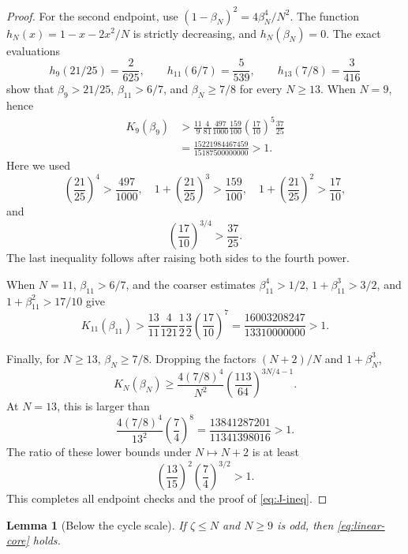 \documentclass[11pt]{article}
\newtheorem{lemma}[theorem]{Lemma}
\begin{document}
\begin{proof}
For the second endpoint, use
\((1-\beta_N)^2=4\beta_N^4/N^2\).  The function
\(h_N(x)=1-x-2x^2/N\) is strictly decreasing, and \(h_N(\beta_N)=0\).
The exact evaluations
\[
 h_9(21/25)=\frac2{625},\qquad
 h_{11}(6/7)=\frac5{539},\qquad
 h_{13}(7/8)=\frac3{416}
\]
show that \(\beta_9>21/25\), \(\beta_{11}>6/7\), and
\(\beta_N\ge7/8\) for every \(N\ge13\).  When \(N=9\), hence
\[
\begin{aligned}
 K_9(\beta_9)
 &>\frac{11}{9}\frac4{81}
    \frac{497}{1000}\frac{159}{100}
    \left(\frac{17}{10}\right)^5\frac{37}{25}\\
 &=\frac{15221984467459}{15187500000000}>1.
\end{aligned}
\]
Here we used
\[
 \left(\frac{21}{25}\right)^4>\frac{497}{1000},
 \quad
 1+\left(\frac{21}{25}\right)^3>\frac{159}{100},
 \quad
 1+\left(\frac{21}{25}\right)^2>\frac{17}{10},
\]
and
\[
       \left(\frac{17}{10}\right)^{3/4}>\frac{37}{25}.
\]
The last inequality follows after raising both sides to the fourth power.

When \(N=11\), \(\beta_{11}>6/7\), and the coarser estimates
\(\beta_{11}^4>1/2\), \(1+\beta_{11}^3>3/2\), and
\(1+\beta_{11}^2>17/10\) give
\[
 K_{11}(\beta_{11})
 >\frac{13}{11}\frac4{121}\frac12\frac32
   \left(\frac{17}{10}\right)^7
 =\frac{16003208247}{13310000000}>1.
\]

Finally, for \(N\ge13\), \(\beta_N\ge7/8\).  Dropping the factors
\((N+2)/N\) and \(1+\beta_N^3\),
\[
 K_N(\beta_N)
 \ge\frac{4(7/8)^4}{N^2}
    \left(\frac{113}{64}\right)^{3N/4-1}.
\]
At \(N=13\), this is larger than
\[
       \frac{4(7/8)^4}{13^2}\left(\frac74\right)^8
       =\frac{13841287201}{11341398016}>1.
\]
The ratio of these lower bounds under \(N\mapsto N+2\) is at least
\[
       \left(\frac{13}{15}\right)^2
       \left(\frac74\right)^{3/2}>1.
\]
This completes all endpoint checks and the proof of
\eqref{eq:J-ineq}.
\end{proof}

\begin{lemma}[Below the cycle scale]\label{lem:linear-low-zeta}
If \(\zeta\le N\) and \(N\ge9\) is odd, then
\eqref{eq:linear-core} holds.
\end{lemma}
\end{document}
